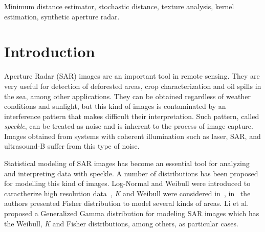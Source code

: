 \documentclass[technote,onecolumn,draftcls,12pt]{IEEEtran}
\numberwithin{equation}{section}
\begin{document}
\begin{abstract}
\end{abstract}

\begin{keywords}
Minimum distance estimator, stochastic distance, texture analysis, kernel estimation, synthetic aperture radar.
\end{keywords}

\IEEEpeerreviewmaketitle

\section{Introduction}
\label{intro}
 Aperture Radar (SAR) images are an important tool in
remote sensing. 
They are very useful for detection of deforested areas, crop characterization and oil spills in the sea, among other applications. 
%
They can be obtained regardless of weather conditions and sunlight, but this kind of images is contaminated by an interference pattern that makes difficult their interpretation. 
Such pattern, called \textit{speckle}, can be treated as noise and is inherent to the process of image capture. 
Images obtained from systems with coherent illumination such as laser, SAR, and ultrasound-B suffer from this type of noise.

Statistical modeling of SAR images has become an essential tool for analyzing and interpreting data with speckle. 
A number of distributions has been proposed for modelling this kind of images. 
Log-Normal and Weibull were introduced to caractherize high resolution data~\cite{oliverquegan98}, 
\textit{K} and Weibull were considered in~\cite{Oliver1993}, 
in~\cite{Tison2004} the authors presented Fisher distribution to model several kinds of areas. 
Li et al.~\cite{Li2011} proposed a Generalized Gamma distribution for modeling SAR images 
which has the Weibull, \textit{K} and Fisher distributions, among others, as particular cases.
\end{document}

